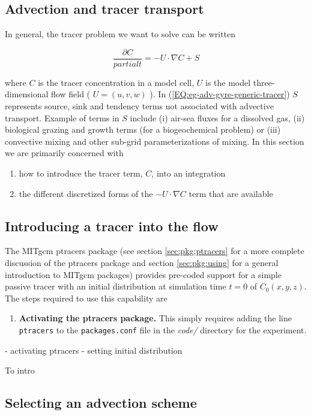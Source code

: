 \subsection{Advection and tracer transport}

In general, the tracer problem we want to solve can be written

\begin{equation}
\label{EQ:eg-adv-gyre-generic-tracer}
\frac{\partial C}{partial t} = -U \cdot \nabla C + S
\end{equation}

where $C$ is the tracer concentration in a model cell, $U$ is the model three-dimensional
flow field ( $U=(u,v,w)$ ). In (\ref{EQ:eg-adv-gyre-generic-tracer}) $S$ represents source, sink 
and tendency terms not associated with advective transport. Example of terms in $S$ include
(i) air-sea fluxes for a dissolved gas, (ii) biological grazing and growth terms (for a 
biogeochemical problem) or (iii) convective mixing and other sub-grid parameterizations of 
mixing. In this section we are primarily concerned with 
\begin{enumerate}
\item how to introduce the tracer term, $C$, into an integration
\item the different discretized forms of 
the $-U \cdot \nabla C$ term that are available
\end{enumerate}


\subsection{Introducing a tracer into the flow}

 The MITgcm ptracers package (see section \ref{sec:pkg:ptracers} for a more complete discussion
of the ptracers package and section \ref{sec:pkg:using} for a general introduction to MITgcm 
packages) provides pre-coded support for a simple passive tracer with an initial
distribution at simulation time $t=0$ of $C_0(x,y,z)$. The steps required to use this capability
are 
\begin{enumerate}
\item{\bf Activating the ptracers package.} This simply requires adding the line {\tt ptracers} to
the {\tt packages.conf} file in the {\it code/} directory for the experiment.
\end{enumerate}

- activating ptracers
- setting initial distribution

To intro
\subsection{Selecting an advection scheme}

